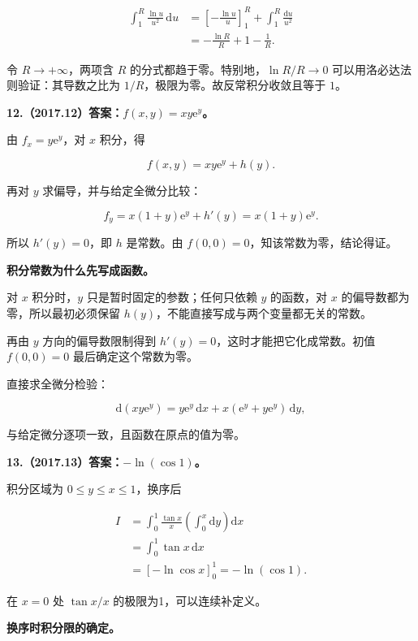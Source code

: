 \documentclass[UTF8,11pt,fontset=windows]{ctexart}
\begin{document}
$$
\begin{aligned}
\int_1^R\frac{\ln u}{u^2}\,\mathrm du
&=\left[-\frac{\ln u}{u}\right]_1^R+\int_1^R\frac{\mathrm du}{u^2}\\
&=-\frac{\ln R}{R}+1-\frac1R.
\end{aligned}
$$

令 $R\to+\infty$，两项含 $R$ 的分式都趋于零。特别地，$\ln R/R\to0$ 可以用洛必达法则验证：其导数之比为 $1/R$，极限为零。故反常积分收敛且等于 $1$。

\clearpage

\textbf{12.（2017.12）答案：$f(x,y)=xy\mathrm e^y$。}

由 $f_x=y\mathrm e^y$，对 $x$ 积分，得

$$
f(x,y)=xy\mathrm e^y+h(y).
$$

再对 $y$ 求偏导，并与给定全微分比较：

$$
f_y=x(1+y)\mathrm e^y+h'(y)=x(1+y)\mathrm e^y.
$$

所以 $h'(y)=0$，即 $h$ 是常数。由 $f(0,0)=0$，知该常数为零，结论得证。

\textbf{积分常数为什么先写成函数。}

对 $x$ 积分时，$y$ 只是暂时固定的参数；任何只依赖 $y$ 的函数，对 $x$ 的偏导数都为零，所以最初必须保留 $h(y)$，不能直接写成与两个变量都无关的常数。

再由 $y$ 方向的偏导数限制得到 $h'(y)=0$，这时才能把它化成常数。初值 $f(0,0)=0$ 最后确定这个常数为零。

直接求全微分检验：

$$
\mathrm d(xy\mathrm e^y)
=y\mathrm e^y\,\mathrm dx
+x(\mathrm e^y+y\mathrm e^y)\,\mathrm dy,
$$

与给定微分逐项一致，且函数在原点的值为零。

\clearpage

\textbf{13.（2017.13）答案：$-\ln(\cos1)$。}

积分区域为 $0\le y\le x\le1$，换序后

$$
\begin{aligned}
I&=\int_0^1\frac{\tan x}{x}\left(\int_0^x\mathrm dy\right)\mathrm dx\\
&=\int_0^1\tan x\,\mathrm dx\\
&=\left[-\ln\cos x\right]_0^1=-\ln(\cos1).
\end{aligned}
$$

在 $x=0$ 处 $\tan x/x$ 的极限为1，可以连续补定义。

\textbf{换序时积分限的确定。}
\end{document}
